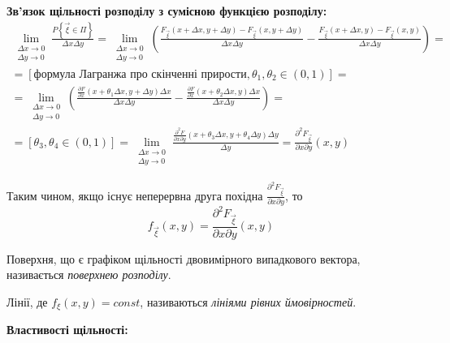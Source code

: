 \noindent\textbf{Зв'язок щільності розподілу з сумісною функцією розподілу: }
\begin{gather*}
    \lim_{\substack{\Delta x \to 0 \\ 
\Delta y \to 0}} \frac{P\left\{\vec{\xi} \in \Pi\right\}}
{\Delta x \Delta y} = 
\lim_{\substack{\Delta x \to 0 \\ \Delta y \to 0}} 
\left(
    \frac{F_{\vec{\xi}}(x+\Delta x, y+\Delta y) - F_{\vec{\xi}}(x, y+\Delta y)}
    {\Delta x \Delta y}
    -
    \frac{F_{\vec{\xi}}(x+\Delta x, y) - F_{\vec{\xi}}(x, y)}
    {\Delta x \Delta y}
\right) = \\
= \left[\text{формула Лагранжа про скінченні прирости}, \theta_1, \theta_2 \in (0, 1)\right] = \\
= \lim_{\substack{\Delta x \to 0 \\ \Delta y \to 0}} 
\left(
    \frac{\frac{\partial F}{\partial x}(x + \theta_1 \Delta x, y + \Delta y)\Delta x}
    {\Delta x \Delta y}
    -
    \frac{\frac{\partial F}{\partial x}(x + \theta_2 \Delta x, y)\Delta x}
    {\Delta x \Delta y}
\right) =  \\
= \left[\theta_3, \theta_4 \in (0, 1)\right] 
= \lim_{\substack{\Delta x \to 0 \\ \Delta y \to 0}}
\frac{\frac{\partial^2 F}{\partial x \partial y}(x + \theta_3 \Delta x, 
y + \theta_4 \Delta y)\Delta y}
{\Delta y} = \frac{\partial^2 F_{\vec{\xi}}}{\partial x \partial y}(x, y)\end{gather*}

Таким чином, якщо існує неперервна друга похідна $ \frac{\partial^2 F_{\vec{\xi}}}{\partial x \partial y}$, то
\begin{equation}\label{eq:dens_r2}
    f_{\vec{\xi}}(x, y) = \frac{\partial^2 F_{\vec{\xi}}}{\partial x \partial y}(x, y)
\end{equation}

\begin{definition}
    Поверхня, що є графіком щільності двовимірного випадкового вектора, називається 
    \emph{поверхнею розподілу}.
\end{definition}
\begin{definition}
    Лінії, де $f_\xi(x, y) = const$, називаються \emph{лініями рівних ймовірностей}.
\end{definition}

\noindent\textbf{Властивості щільності: }

